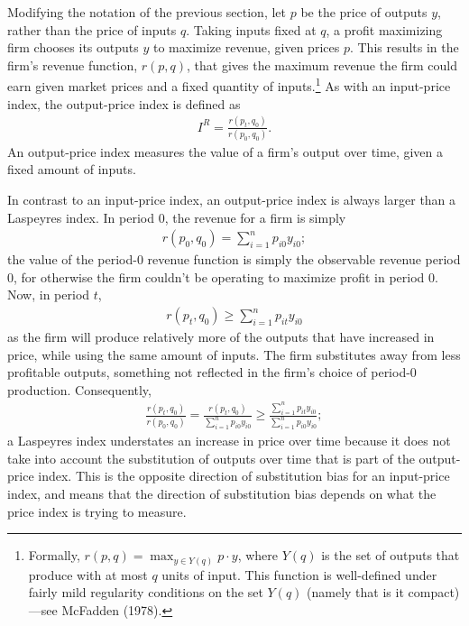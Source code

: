 \documentclass[
]{article}
\begin{document}
Modifying the notation of the previous section, let \(p\) be the price of outputs \(y\), rather than the price of inputs \(q\). Taking inputs fixed at \(q\), a profit maximizing firm chooses its outputs \(y\) to maximize revenue, given prices \(p\). This results in the firm's revenue function, \(r(p, q)\), that gives the maximum revenue the firm could earn given market prices and a fixed quantity of inputs.\footnote{Formally, \(r(p, q) = \max_{y \in Y(q)} p \cdot y\), where \(Y(q)\) is the set of outputs that produce with at most \(q\) units of input. This function is well-defined under fairly mild regularity conditions on the set \(Y(q)\) (namely that is it compact)---see McFadden (1978).} As with an input-price index, the output-price index is defined as
\begin{align*}
I^{R} = \frac{r(p_{t}, q_{0})}{r(p_{0}, q_{0})}.
\end{align*}
An output-price index measures the value of a firm's output over time, given a fixed amount of inputs.

In contrast to an input-price index, an output-price index is always larger than a Laspeyres index. In period 0, the revenue for a firm is simply
\begin{align*}
r(p_{0}, q_{0}) = \sum_{i = 1}^{n} p_{i0} y_{i0};
\end{align*}
the value of the period-0 revenue function is simply the observable revenue period 0, for otherwise the firm couldn't be operating to maximize profit in period 0. Now, in period \(t\),
\begin{align*}
r(p_{t}, q_{0}) \geq \sum_{i = 1}^{n} p_{it} y_{i0}
\end{align*}
as the firm will produce relatively more of the outputs that have increased in price, while using the same amount of inputs. The firm substitutes away from less profitable outputs, something not reflected in the firm's choice of period-0 production. Consequently,
\begin{align*}
\frac{r(p_{t}, q_{0})}{r(p_{0}, q_{0})} = \frac{r(p_{t}, q_{0})}{\sum_{i = 1}^{n} p_{i0} y_{i0}} \geq \frac{\sum_{i = 1}^{n} p_{it} y_{i0}}{\sum_{i = 1}^{n} p_{i0} y_{i0}};
\end{align*}
a Laspeyres index understates an increase in price over time because it does not take into account the substitution of outputs over time that is part of the output-price index. This is the opposite direction of substitution bias for an input-price index, and means that the direction of substitution bias depends on what the price index is trying to measure.
\end{document}
